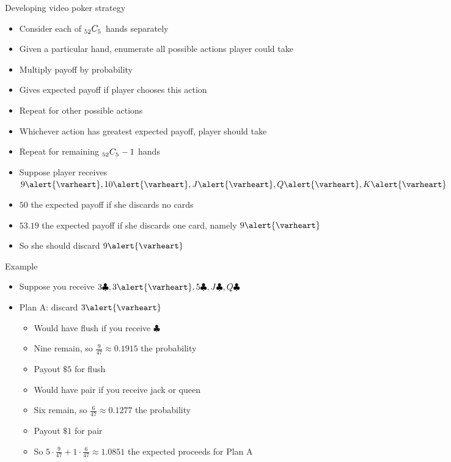 \documentclass[handout,xcolor=dvipsnames]{beamer}
\theoremstyle{definition}
\newcommand\ncr[2]{\tensor[_{#1}]C{_{#2}}}
\newcommand{\hs}{\alert{\varheart}}
\newcommand{\cs}{\clubsuit}
\begin{document}
\begin{frame}{Developing video poker strategy}
\begin{itemize}
\item Consider each of $\ncr{52}{5}$ hands separately
\item Given a particular hand, enumerate
all possible actions player could take
\item Multiply payoff by probability
\item Gives expected payoff if player chooses this action
\item Repeat for other possible actions
\item Whichever action has greatest
expected payoff, player should take
\item Repeat for remaining $\ncr{52}{5}-1$ hands
\end{itemize}
\begin{example}
\begin{itemize}
\item Suppose player receives $9\hs,10\hs,J\hs,Q\hs,K\hs$
\item $50$ the expected payoff if she discards no cards
\item $53.19$ the expected payoff if she discards
one card, namely $9\hs$
\item So she should discard $9\hs$
\end{itemize}
\end{example}
\end{frame}

\begin{frame}{Example}
\begin{itemize}
\item Suppose you receive
$3\cs,3\hs,5\cs,J\cs,Q\cs$
\item Plan A: discard $3\hs$
\begin{itemize}
\item Would have flush if you receive $\cs$
\item Nine remain, so $\frac{9}{47}\approx
0.1915$ the probability
\item Payout $\$5$ for flush
\item Would have pair if you receive jack or queen
\item Six remain, so $\frac{6}{47}\approx 0.1277$
the probability
\item Payout $\$1$ for pair
\item So $5\cdot\frac{9}{47}+1\cdot\frac{6}{47}
\approx 1.0851$ the expected proceeds for Plan A
\end{itemize}
\end{itemize}
\end{frame}
\end{document}
